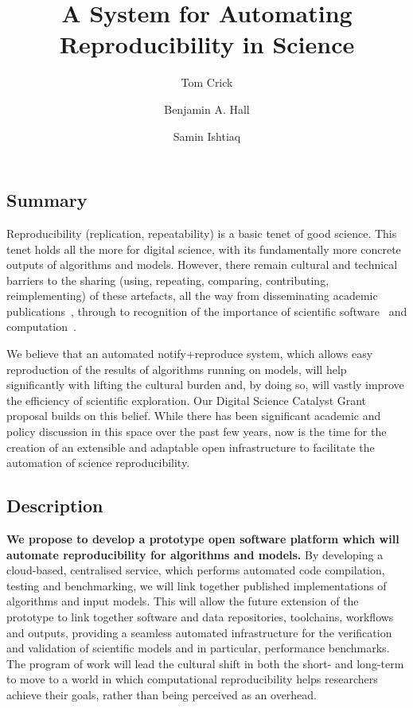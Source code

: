 \documentclass[a4paper,11pt]{article}
\title{\vspace{-4em}A System for Automating Reproducibility in Science}
\author[1]{Tom Crick}
\author[2]{Benjamin A. Hall}
\author[3]{Samin Ishtiaq}
\affil[1]{Department of Computing \& Information Systems, Cardiff Metropolitan University}
\affil[2]{MRC Cancer Unit, University of Cambridge}
\affil[3]{Microsoft Research Cambridge}
\affil[1]{\protect\url{tcrick@cardiffmet.ac.uk}}
\date{ }
\begin{document}
\maketitle





\vspace{-1.5cm}
\subsection*{Summary}

Reproducibility (replication, repeatability) is a basic tenet of good
science. This tenet holds all the more for digital science, with its
fundamentally more concrete outputs of algorithms and models. However,
there remain cultural and technical barriers to the sharing (using,
repeating, comparing, contributing, reimplementing) of these
artefacts, all the way from disseminating academic
publications~\cite{deroure:2010,stodden-et-al:2013,fursin+dubach:2014},
through to recognition of the importance of scientific
software~\cite{goble:2014} and computation~\cite{gent:2013}.

We believe that an automated notify+reproduce system, which allows
easy reproduction of the results of algorithms running on models, will
help significantly with lifting the cultural burden and, by doing so,
will vastly improve the efficiency of scientific exploration. Our
Digital Science Catalyst Grant proposal builds on this belief. While
there has been significant academic and policy discussion in this
space over the past few years, now is the time for the creation of an
extensible and adaptable open infrastructure to facilitate the
automation of science reproducibility.


\subsection*{Description}
{\textbf{We propose to develop a prototype open software platform
which will automate reproducibility for algorithms and models.}}  By
developing a cloud-based, centralised service, which performs
automated code compilation, testing and benchmarking, we will link
together published implementations of algorithms and input
models. This will allow the future extension of the prototype to link
together software and data repositories, toolchains, workflows and
outputs, providing a seamless automated infrastructure for the
verification and validation of scientific models and in particular,
performance benchmarks. The program of work will lead the cultural
shift in both the short- and long-term to move to a world in which
computational reproducibility helps researchers achieve their goals,
rather than being perceived as an overhead.
\end{document}
